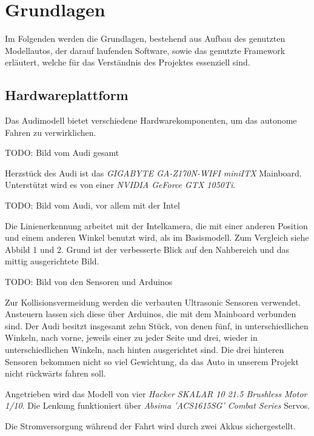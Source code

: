 \documentclass[12pt,a4paper]{report}
\begin{document}
\chapter{Grundlagen}

Im Folgenden werden die Grundlagen, bestehend aus Aufbau des genutzten Modellautos, der darauf laufenden Software, sowie das genutzte Framework erläutert, welche für das Verständnis des Projektes essenziell sind.

\section{Hardwareplattform}

Das Audimodell bietet verschiedene Hardwarekomponenten, um das autonome Fahren zu verwirklichen.

TODO: Bild vom Audi gesamt

Herzstück des Audi ist das \emph{GIGABYTE GA-Z170N-WIFI miniITX} Mainboard. Unterstützt wird es von einer \emph{NVIDIA GeForce GTX 1050Ti}. 

TODO: Bild vom Audi, vor allem mit der Intel 

Die Linienerkennung arbeitet mit der Intelkamera, die mit einer anderen Position und einem anderen Winkel benutzt wird, als im Basismodell. Zum Vergleich siehe Abbild 1 und 2. Grund ist der verbesserte Blick auf den Nahbereich und das mittig ausgerichtete Bild.

TODO: Bild von den Sensoren und Arduinos

Zur Kollisionsvermeidung werden die verbauten Ultrasonic Sensoren verwendet. Ansteuern lassen sich diese über Arduinos, die mit dem Mainboard verbunden sind. Der Audi besitzt insgesamt zehn Stück, von denen fünf, in unterschiedlichen Winkeln, nach vorne, jeweils einer zu jeder Seite und drei, wieder in unterschiedlichen Winkeln, nach hinten ausgerichtet sind. Die drei hinteren Sensoren bekommen nicht so viel Gewichtung, da das Auto in unserem Projekt nicht rückwärts fahren soll.

Angetrieben wird das Modell von vier \emph{Hacker SKALAR 10 21.5 Brushless Motor 1/10}.
Die Lenkung funktioniert über \emph{Absima 'ACS1615SG' Combat Series} Servos. 

Die Stromversorgung während der Fahrt wird durch zwei Akkus sichergestellt.
\end{document}
